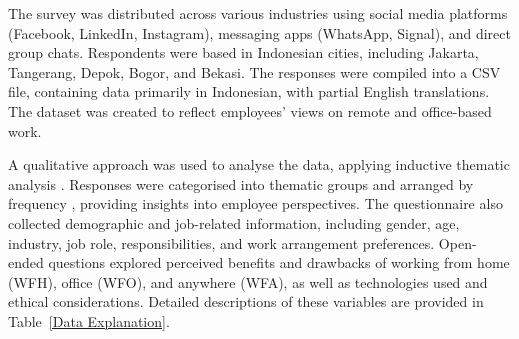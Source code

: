\documentclass[conference]{IEEEtran}
\begin{document}
The survey was distributed across various industries using social media platforms (Facebook, LinkedIn, Instagram), messaging apps (WhatsApp, Signal), and direct group chats. Respondents were based in Indonesian cities, including Jakarta, Tangerang, Depok, Bogor, and Bekasi. The responses were compiled into a CSV file, containing data primarily in Indonesian, with partial English translations. The dataset was created to reflect employees' views on remote and office-based work.

A qualitative approach was used to analyse the data, applying inductive thematic analysis \cite{hamilton2019qualitative,kumar2018qualitative}. Responses were categorised into thematic groups and arranged by frequency \cite{seixas2018qualitative,turale2020brief}, providing insights into employee perspectives. The questionnaire also collected demographic and job-related information, including gender, age, industry, job role, responsibilities, and work arrangement preferences. Open-ended questions explored perceived benefits and drawbacks of working from home (WFH), office (WFO), and anywhere (WFA), as well as technologies used and ethical considerations. Detailed descriptions of these variables are provided in Table~\ref{Data Explanation}.
\end{document}
